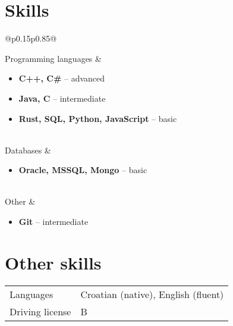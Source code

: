 \documentclass[a4paper]{article}
\makeatletter
\newlength{\tablewidth}
\newenvironment{skills}{%
\setlength{\tablewidth}{\linewidth}
\addtolength{\tablewidth}{-2\tabcolsep}
\begin{tabular}{@{}p{0.15\tablewidth}p{0.85\tablewidth}@{}}
}{%
\end{tabular}
}
\makeatother
\begin{document}
\section{Skills}
\begin{skills}
	Programming languages &
	\begin{itemize}
                \item \textbf{C++, C\#} -- advanced
		\item \textbf{Java, C} -- intermediate
		\item \textbf{Rust, SQL, Python, JavaScript} -- basic
	\end{itemize} \\
        Databases &
        \begin{itemize}
                \item \textbf{Oracle, MSSQL, Mongo} -- basic
        \end{itemize} \\
	Other &
	\begin{itemize}
		\item \textbf{Git} -- intermediate
	\end{itemize}
\end{skills}

\section{Other skills}
\begin{skills}
    Languages & Croatian (native), English (fluent) \\
    Driving license & B \\
\end{skills}
\end{document}
